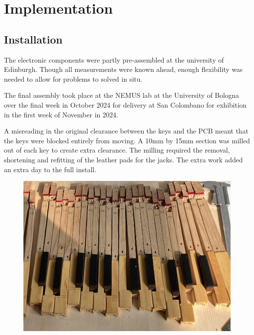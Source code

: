 
\section{Implementation}\label{implementation}

\subsection{Installation}\label{installation}

The electronic components were partly pre-assembled at the university of
Edinburgh. Though all measurements were known ahead, enough flexibility
was needed to allow for problems to solved in situ.

The final assembly took place at the NEMUS lab at the University of
Bologna over the final week in October 2024 for delivery at San
Colombano for exhibition in the first week of November in 2024.

A misreading in the original clearance between the keys and the PCB
meant that the keys were blocked entirely from moving. A 10mm by 15mm
section was milled out of each key to create extra
clearance. The milling required the removal, shortening and refitting of
the leather pads for the jacks. The extra work
added an extra day to the full install.

\begin{figure}  
  \centering
  \includegraphics[width=\linewidth]{src/images/keys-milled.jpeg} 
  \caption{} 
  \Description{} 
  \label{fig:milling}
\end{figure}

